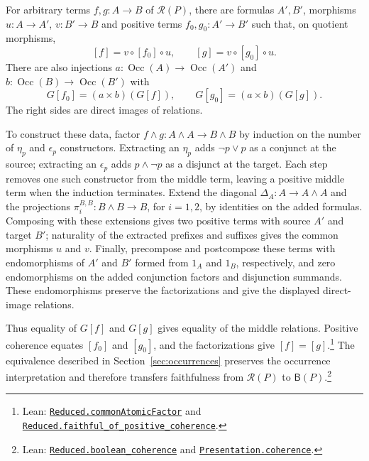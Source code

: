 \documentclass[11pt]{article}
\newcommand{\B}{\mathsf B}
\newcommand{\Occ}{\operatorname{Occ}}
\begin{document}
For arbitrary terms $f,g:A\to B$ of $\mathcal R(P)$, there are
formulas $A',B'$, morphisms
$u:A\to A'$, $v:B'\to B$ and positive terms
$f_0,g_0:A'\to B'$ such that, on quotient morphisms,
\[
 [f]=v\circ[f_0]\circ u,\qquad [g]=v\circ[g_0]\circ u.
\]
There are also injections
$a:\Occ(A)\to\Occ(A')$ and $b:\Occ(B)\to\Occ(B')$ with
\[
 G[f_0]=(a\times b)(G[f]),\qquad
 G[g_0]=(a\times b)(G[g]).
\]
The right sides are direct images of relations.

To construct these data, factor $f\wedge g:A\wedge A\to B\wedge B$
by induction on the number of $\eta_p$ and $\epsilon_p$
constructors. Extracting an $\eta_p$ adds $\neg p\vee p$ as a
conjunct at the source; extracting an $\epsilon_p$ adds
$p\wedge\neg p$ as a disjunct at the target. Each step removes
one such constructor from the middle term, leaving a positive
middle term when the induction terminates. Extend the diagonal
$\Delta_A:A\to A\wedge A$ and the projections
$\pi_i^{B,B}:B\wedge B\to B$, for $i=1,2$, by identities on
the added formulas. Composing with these extensions gives two
positive terms with source $A'$ and target $B'$; naturality of
the extracted prefixes and suffixes gives the common morphisms
$u$ and $v$. Finally, precompose and postcompose these terms
with endomorphisms of $A'$ and $B'$ formed from $1_A$ and
$1_B$, respectively, and zero endomorphisms on the added
conjunction factors and disjunction summands.
These endomorphisms preserve the factorizations and give the
displayed direct-image relations.

Thus equality of $G[f]$ and $G[g]$ gives equality of the middle relations.
Positive coherence equates $[f_0]$ and $[g_0]$, and the
factorizations give $[f]=[g]$.\footnote{\raggedright Lean:
\href{https://github.com/flengyel/Dosen-Petric-Maximality/blob/dosen-petric-v25-palomar-v3/DosenPetric/CommonAtomicFactorization.lean\#L51}{\texttt{Reduced.\allowbreak{}commonAtomicFactor}} and
\href{https://github.com/flengyel/Dosen-Petric-Maximality/blob/dosen-petric-v25-palomar-v3/DosenPetric/CommonAtomicFactorization.lean\#L123}{\texttt{Reduced.\allowbreak{}faithful\_of\_positive\_coherence}}.}
The equivalence described in Section~\ref{sec:occurrences}
preserves the occurrence interpretation and therefore transfers
faithfulness from $\mathcal R(P)$ to $\B(P)$.\footnote{\raggedright Lean:
\href{https://github.com/flengyel/Dosen-Petric-Maximality/blob/dosen-petric-v25-palomar-v3/DosenPetric/ReducedCoherence.lean\#L17}{\texttt{Reduced.\allowbreak{}boolean\_coherence}} and
\href{https://github.com/flengyel/Dosen-Petric-Maximality/blob/dosen-petric-v25-palomar-v3/DosenPetric/PresentationCoherence.lean\#L13}{\texttt{Presentation.\allowbreak{}coherence}}.}
\end{document}
